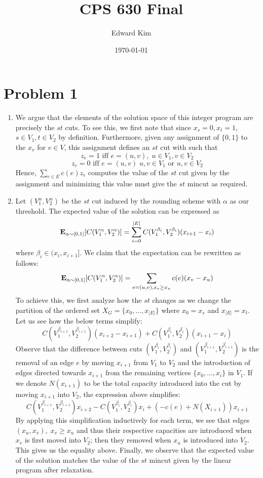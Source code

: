 \documentclass[12pt]{article}%
\begin{document}
\title{CPS 630 Final}
\author{Edward Kim}
\date{\today}
\maketitle

\section*{Problem 1}
\begin{enumerate}
  \item We argue that the elements of the solution space of this integer program are precisely the $st$ cuts. To see this, we first note that since $x_s =0, x_t = 1$, $s \in V_1, t \in V_2$ by definition. Furthermore, given any assignment of $\{0,1\}$ to the $x_v$ for $v \in V$, this assignment defines an $st$ cut with such that $$z_e = 1  \text{ iff } e = (u,v), \; u \in V_1, v \in V_2 $$ $$ z_e = 0 \text{ iff } e= (u,v) \; u,v \in V_1 \text{ or } u,v \in V_2 $$ Hence, $\sum_{e \in E} c(e)z_e$ computes the value of the $st$ cut given by the assignment and minimizing this value must give the $st$ mincut as required.
  \item Let $(V^\alpha_1,V^\alpha_2)$ be the $st$ cut induced by the rounding scheme with $\alpha$ as our threshold. The expected value of the solution can be expressed as
  $${\bf E}_{\alpha \sim [0,1]}[C(V^\alpha_1,V^\alpha_2)] = \sum_{i=0}^{|E|} C(V^{\beta_i}_1,V^{\beta_i}_2)(x_{i+1} - x_i) $$
  where $\beta_i \in (x_i,x_{i+1}]$. We claim that the expectation can be rewritten as follows:
  $$ {\bf E}_{\alpha \sim [0,1]}[C(V^\alpha_1,V^\alpha_2)] = \sum_{e = (u,v), x_v \geq x_u} c(e)(x_v - x_u)$$
  To achieve this, we first analyze how the $st$ changes as we change the partition of the ordered set $X_G =\{x_0,...,x_{|E|}\}$ where $x_0 = x_s$ and $x_{|E|} = x_t$. Let us see how the below terms simplify:
  $$C(V^{\beta_{i+1}}_1,V^{\beta_{i+1}}_2)(x_{i+2} - x_{i+1}) + C(V^{\beta_i}_1,V^{\beta_i}_2)(x_{i+1} - x_i)  $$
  Observe that the difference between cuts $(V^{\beta_i}_1,V^{\beta_i}_2)$ and $(V^{\beta_{i+1}}_1,V^{\beta_{i+1}}_2)$ is the removal of an edge $e$ by moving $x_{i+1}$ from $V_1$ to $V_2$ and the introduction of edges directed towards $x_{i+1}$ from the remaining vertices $\{x_0,...,x_{i}\}$ in $V_1$. If we denote $N(x_{i+1})$ to be the total capacity introduced into the cut by moving $x_{i+1}$ into $V_2$, the expression above simplifies:
  $$C(V^{\beta_{i+1}}_1,V^{\beta_{i+1}}_2)x_{i+2} - C(V^{\beta_i}_1,V^{\beta_i}_2)x_i + (-c(e) + N(X_{i+1}))x_{i+1} $$
  By applying this simplification inductively for each term, we see that edges $(x_u,x_v), \; x_v \geq x_u$ and thus their respective capacities are introduced when $x_v$ is first moved into $V_2$; then they removed when $x_u$ is introduced into $V_2$. This gives us the equality above. Finally, we observe that the expected value of the solution matches the value of the $st$ mincut given by the linear program after relaxation.
\end{enumerate}
\end{document}

